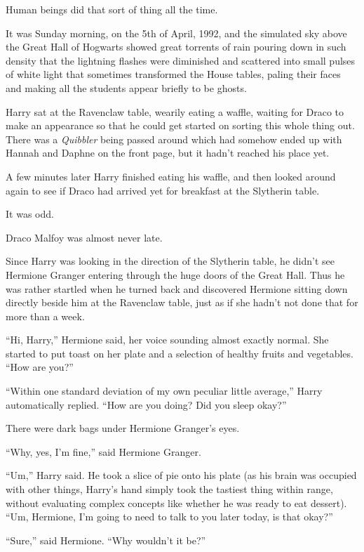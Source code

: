 Human beings did that sort of thing all the time.

\later

It was Sunday morning, on the 5th of April, 1992, and the simulated sky above the Great Hall of Hogwarts showed great torrents of rain pouring down in such density that the lightning flashes were diminished and scattered into small pulses of white light that sometimes transformed the House tables, paling their faces and making all the students appear briefly to be ghosts.

Harry sat at the Ravenclaw table, wearily eating a waffle, waiting for Draco to make an appearance so that he could get started on sorting this whole thing out. There was a \emph{Quibbler} being passed around which had somehow ended up with Hannah and Daphne on the front page, but it hadn’t reached his place yet.

A few minutes later Harry finished eating his waffle, and then looked around again to see if Draco had arrived yet for breakfast at the Slytherin table.

It was odd.

Draco Malfoy was almost never late.

Since Harry was looking in the direction of the Slytherin table, he didn’t see Hermione Granger entering through the huge doors of the Great Hall. Thus he was rather startled when he turned back and discovered Hermione sitting down directly beside him at the Ravenclaw table, just as if she hadn’t not done that for more than a week.

“Hi, Harry,” Hermione said, her voice sounding almost exactly normal. She started to put toast on her plate and a selection of healthy fruits and vegetables. “How are you?”

“Within one standard deviation of my own peculiar little average,” Harry automatically replied. “How are you doing? Did you sleep okay?”

There were dark bags under Hermione Granger’s eyes.

“Why, yes, I’m fine,” said Hermione Granger.

“Um,” Harry said. He took a slice of pie onto his plate (as his brain was occupied with other things, Harry’s hand simply took the tastiest thing within range, without evaluating complex concepts like whether he was ready to eat dessert). “Um, Hermione, I’m going to need to talk to you later today, is that okay?”

“Sure,” said Hermione. “Why wouldn’t it be?”

